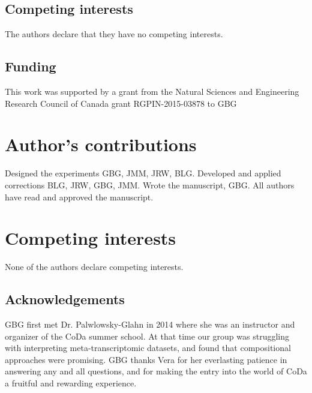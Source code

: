 \documentclass[graybox]{svmult}
\begin{document}
\subsection*{Competing interests}
The authors declare that they have no competing interests.
  
\subsection*{Funding}
This work was supported by a grant from the Natural Sciences and Engineering Research Council of Canada grant RGPIN-2015-03878 to GBG

\section*{Author's contributions}
 Designed the experiments GBG, JMM, JRW, BLG. Developed and applied corrections BLG, JRW, GBG, JMM. Wrote the manuscript, GBG. All authors have read and approved the manuscript.

\section{Competing interests}

None of the authors declare competing interests.

\subsection*{Acknowledgements}
GBG first met Dr. Palwlowsky-Glahn in 2014 where she was an instructor and organizer of the CoDa summer school. At that time our group was struggling with interpreting meta-transcriptomic datasets, and found that compositional approaches were promising. GBG thanks Vera for her everlasting patience in answering any and all questions, and for making the entry into the world of CoDa a fruitful and rewarding experience.



%
\end{document}
